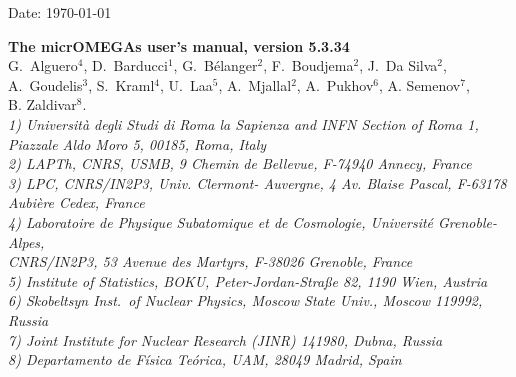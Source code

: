 \documentclass[12pt,a4paper]{article}
\begin{document}
\def\micro{{\tt micrOMEGAs}}
\def\ra{\rightarrow}
\def\calchep{{\tt CalcHEP}}

\def\suspect{{\tt SuSpect}}
\def\mbmb{m_b(m_b)}
\def\mt{m_t}
\def\dMb{\Delta m_b}
\def\dMq{\Delta m_q}
\def\delrho{\Delta\rho}
\def\bsgamma{b\to s\gamma}
\def\bsmu{B_s\to \mu^+\mu^-}
\def\gmuon{(g-2)_\mu}
\def\noi{\noindent}
\def\VERSION{5.3.34}
\def\neuto{\tilde\chi^0_1}
\def\neuti{\tilde\chi^0_i}
\def\neutt{\tilde\chi^0_2}
\def\neuth{\tilde\chi^0_3}
\def\smodels{{\tt SModelS}}
\def\lilith{{\tt Lilith}}
\def\HB{{\tt HiggsBounds}}
\def\HS{{\tt HiggsSignals}}

\def\eg{{\it e.g.}}
\def\ie{{\it i.e.}}

\def\br{{\rm BR}}



\def\wimpsim{{\tt WimpSim}}
\def\pppc{{\tt }PPPC4DM$\nu$}
\newcommand{\gb}{\color{blue}}
\def\SK#1{\textcolor{cyan}{#1}}

\begin{flushright}
   \vspace*{-18mm}
   Date: \today
\end{flushright}
\vspace*{2mm}




\begin{center}


{\Large\bf The micrOMEGAs  user's manual, version \VERSION} \\[8mm]

{\large   G.~Alguero$^{4}$, D.~Barducci$^{1}$, G.~B\'elanger$^2$,  F.~Boudjema$^2$, J.~Da Silva$^{2}$,\\[2mm] A.~Goudelis$^{3}$, S.~Kraml$^{4}$, U.~Laa$^{5}$, A.~Mjallal$^{2}$, 
A.~Pukhov$^6$,  A. Semenov$^7$, \\[2mm]B. Zaldivar$^{8}$.}\\[4mm]

{\it 
1) Universit\`a degli Studi di Roma la Sapienza and INFN Section of Roma 1,\\ Piazzale Aldo Moro 5, 00185, Roma, Italy\\
2) LAPTh, CNRS, USMB, 9 Chemin de Bellevue,  F-74940 Annecy, France\\
3) LPC, CNRS/IN2P3, Univ.  Clermont- Auvergne, 4 Av. Blaise Pascal, F-63178 Aubi\`ere Cedex,  France\\
4) {Laboratoire de Physique Subatomique et de Cosmologie}, Universit\'e Grenoble-Alpes,\\ CNRS/IN2P3, 53 Avenue des Martyrs, F-38026 Grenoble,  France\\
5) Institute of Statistics, BOKU, Peter-Jordan-Straße 82, 1190 Wien, Austria\\
6) Skobeltsyn Inst.\ of Nuclear Physics, Moscow State Univ., Moscow 119992, Russia\\
7) Joint Institute for Nuclear Research (JINR) 141980, Dubna,  Russia\\
8) Departamento de F\'isica Te\'orica, UAM, 28049 Madrid, Spain \\}
\end{center}
\end{document}

